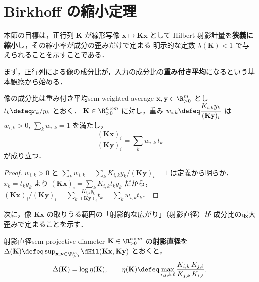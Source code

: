 \section{Birkhoff の縮小定理}
\label{sec:sem-birkhoff}

本節の目標は，正行列 $\mathbf{K}$ が線形写像 $\mathbf{x} \mapsto \mathbf{K}\mathbf{x}$ として
Hilbert 射影計量を\textbf{狭義に縮小}し，その縮小率が成分の歪みだけで定まる
明示的な定数 $\lambda(\mathbf{K}) < 1$ で与えられることを示すことである．

まず，正行列による像の成分比が，入力の成分比の\textbf{重み付き平均}になるという基本観察から始める．

\begin{claim}{像の成分比は重み付き平均}{sem-weighted-average}
  $\mathbf{x}, \mathbf{y} \in \R_{>0}^m$ とし $t_k \defeq x_k / y_k$ とおく．
  $\mathbf{K} \in \R_{>0}^{n\times m}$ に対し，重み
  $w_{i,k} \defeq \dfrac{K_{i,k} y_k}{(\mathbf{K}\mathbf{y})_i}$ は
  $w_{i,k} > 0$, $\sum_k w_{i,k} = 1$ を満たし，
  \[
    \frac{(\mathbf{K}\mathbf{x})_i}{(\mathbf{K}\mathbf{y})_i}
    = \sum_{k} w_{i,k}\, t_k
  \]
  が成り立つ．
\end{claim}

\begin{proof}
  $w_{i,k} > 0$ と $\sum_k w_{i,k} = \sum_k K_{i,k}y_k / (\mathbf{K}\mathbf{y})_i = 1$ は定義から明らか．
  $x_k = t_k y_k$ より
  $(\mathbf{K}\mathbf{x})_i = \sum_k K_{i,k} t_k y_k$ だから，
  $(\mathbf{K}\mathbf{x})_i / (\mathbf{K}\mathbf{y})_i = \sum_k \frac{K_{i,k}y_k}{(\mathbf{K}\mathbf{y})_i} t_k
  = \sum_k w_{i,k} t_k$．
\end{proof}

次に，像 $\mathbf{K}\mathbf{x}$ の取りうる範囲の「射影的な広がり」（射影直径）が
成分比の最大歪みで定まることを示す．

\begin{claim}{射影直径}{sem-projective-diameter}
  $\mathbf{K} \in \R_{>0}^{n\times m}$ の\textbf{射影直径}を
  $\Delta(\mathbf{K}) \defeq \sup_{\mathbf{x}, \mathbf{y} \in \R_{>0}^m} \dHil(\mathbf{K}\mathbf{x}, \mathbf{K}\mathbf{y})$
  とおくと，
  \[
    \Delta(\mathbf{K}) = \log \eta(\mathbf{K}),
    \qquad
    \eta(\mathbf{K}) \defeq \max_{i,j,k,\ell} \frac{K_{i,k}\, K_{j,\ell}}{K_{j,k}\, K_{i,\ell}}.
  \]
\end{claim}

